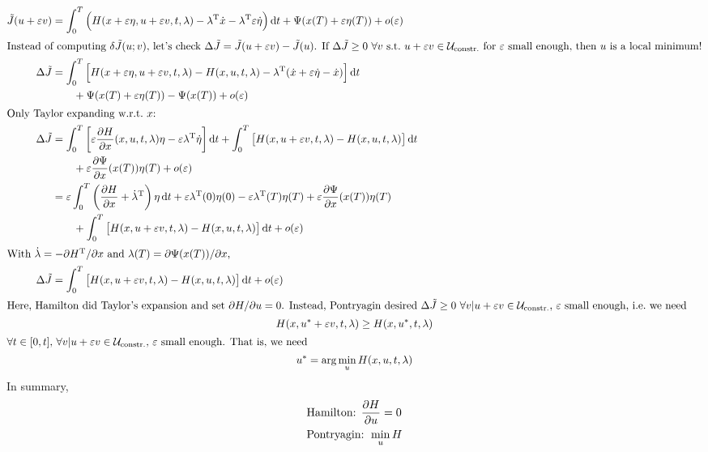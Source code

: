 \begin{gather}
\begin{align}
  \tilde J(u+\varepsilon v) &= \int_0^T \Big( H(x+\varepsilon\eta,u+\varepsilon v,t,\lambda) - \lambda^\text{T}\dot x - \lambda^\text{T}\varepsilon\dot\eta \Big) \mathop{}\!\mathrm{d} t + \Psi(x(T) + \varepsilon\eta(T)) + o(\varepsilon) \\
  \shortintertext{Instead of computing $\delta\tilde J(u;v)$, let's check $\Delta\tilde J=\tilde J(u+\varepsilon v)-\tilde J(u)$. If $\Delta\tilde J\ge 0$ $\forall v$ s.t.\ $u+\varepsilon v\in\mathcal U_{\text{constr.}}$ for $\varepsilon$ small enough, then $u$ is a local minimum!}
  \Delta\tilde J &= \int_0^T \Big[ H(x+\varepsilon\eta,u+\varepsilon v,t,\lambda) - H(x,u,t,\lambda) - \lambda^\text{T}(\dot x + \varepsilon\dot\eta - \dot x) \Big] \mathop{}\!\mathrm{d} t \\
                            & \qquad + \Psi(x(T)+\varepsilon\eta(T)) - \Psi(x(T)) + o(\varepsilon) \\
  \shortintertext{Only Taylor expanding w.r.t.\ $x$:}
  \Delta\tilde J &= \int_0^T \left[\varepsilon\frac{\partial H}{\partial x}(x,u,t,\lambda)\eta - \varepsilon\lambda^\text{T}\dot\eta \right] \mathop{}\!\mathrm{d} t + \int_0^T \big[ H(x,u+\varepsilon v,t,\lambda) - H(x,u,t,\lambda) \big] \mathop{}\!\mathrm{d} t \\
                            & \qquad + \varepsilon\frac{\partial \Psi}{\partial x}(x(T))\eta(T) + o(\varepsilon) \\
                            &= \varepsilon \int_0^T \left( \frac{\partial H}{\partial x} + \dot\lambda^\text{T} \right) \eta\mathop{}\!\mathrm{d} t + \varepsilon\lambda^\text{T}(0)\eta(0) - \varepsilon\lambda^\text{T}(T)\eta(T) + \varepsilon\frac{\partial \Psi}{\partial x}(x(T))\eta(T) \\
                            & \qquad + \int_0^T \big[ H(x,u+\varepsilon v,t,\lambda) - H(x,u,t,\lambda) \big]\mathop{}\!\mathrm{d} t + o(\varepsilon) \\
  \shortintertext{With $\dot\lambda=-\partial H^\text{T}/\partial x$ and $\lambda(T)=\partial\Psi(x(T))/\partial x$,}
  \Delta\tilde J &= \int_0^T \big[ H(x,u+\varepsilon v,t,\lambda) - H(x,u,t,\lambda) \big]\mathop{}\!\mathrm{d} t + o(\varepsilon)
\end{align} \\
  \shortintertext{Here, Hamilton did Taylor's expansion and set $\partial H/\partial u=0$. Instead, Pontryagin desired $\Delta\tilde J\ge 0$ $\forall v|u+\varepsilon v\in\mathcal U_{\text{constr.}}$, $\varepsilon$ small enough, i.e.\ we need}
                            H(x,u^*+\varepsilon v,t,\lambda) \ge H(x,u^*,t,\lambda) \\
  \shortintertext{$\forall t\in[0,t]$, $\forall v|u+\varepsilon v\in\mathcal U_{\text{constr.}}$, $\varepsilon$ small enough. That is, we need}
  u^* = \arg\min_u H(x,u,t,\lambda)
\end{gather}
In summary,
\begin{align}
  &\text{Hamilton: } \frac{\partial H}{\partial u} = 0 \\
  &\text{Pontryagin: } \min_u H
\end{align}

